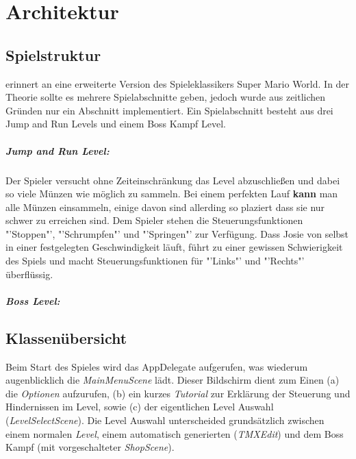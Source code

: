 \chapter{Architektur}\label{ch:arch}

\section{Spielstruktur}\label{sec:3_Spielstruktur}
\gamename  erinnert an eine erweiterte Version des Spieleklassikers Super Mario World.
In der Theorie sollte es mehrere Spielabschnitte geben, jedoch wurde aus zeitlichen Gründen nur ein Abschnitt implementiert. Ein Spielabschnitt besteht aus drei Jump and Run Levels und einem Boss Kampf Level. 

\paragraph{Jump and Run Level:}
Der Spieler versucht ohne Zeiteinschränkung das Level abzuschließen und dabei so viele Münzen wie möglich zu sammeln. Bei einem perfekten Lauf \textbf{kann} man alle Münzen einsammeln, einige davon sind allerding so plaziert dass sie nur schwer zu erreichen sind.
Dem Spieler stehen die Steuerungsfunktionen "'Stoppen"', "'Schrumpfen"' und "'Springen"' zur Verfügung. 
Dass Josie von selbst in einer festgelegten Geschwindigkeit läuft, führt zu einer gewissen Schwierigkeit des Spiels und macht Steuerungsfunktionen für "'Links"' und "'Rechts"' überflüssig.

\paragraph{Boss Level:}



\section{Klassenübersicht}\label{sec:3_Klassenuebersicht}

Beim Start des Spieles wird das AppDelegate aufgerufen, was wiederum augenblicklich die \textit{MainMenuScene} lädt. Dieser Bildschirm dient zum Einen (a) die \textit{Optionen} aufzurufen, (b) ein kurzes \textit{Tutorial} zur Erklärung der Steuerung und Hindernissen im Level, sowie (c) der eigentlichen Level Auswahl (\textit{LevelSelectScene}).
Die Level Auswahl unterscheided grundsätzlich zwischen einem normalen \textit{Level}, einem automatisch generierten (\textit{TMXEdit}) und dem Boss Kampf (mit vorgeschalteter \textit{ShopScene}).

